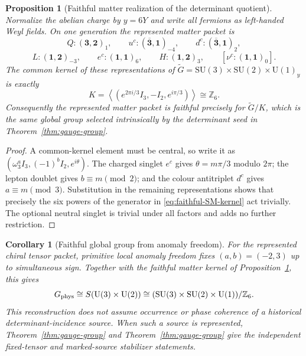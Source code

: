 \documentclass[11pt]{article}
\numberwithin{equation}{section}
\newtheorem{proposition}[theorem]{Proposition}
\newtheorem{corollary}[theorem]{Corollary}
\theoremstyle{definition}
\theoremstyle{remark}
\newcommand{\Z}{\mathbb Z}
\newcommand{\U}{\mathrm U}
\newcommand{\SU}{\mathrm{SU}}
\begin{document}
\begin{proposition}[Faithful matter realization of the determinant quotient]
\label{prop:faithful-SM-quotient}
Normalize the abelian charge by $y=6Y$ and write all fermions as left-handed
Weyl fields.  On one generation the represented matter packet is
\[
Q:(\mathbf3,\mathbf2)_1,
\qquad
u^c:(\overline{\mathbf3},\mathbf1)_{-4},
\qquad
d^c:(\overline{\mathbf3},\mathbf1)_2,
\]
\[
L:(\mathbf1,\mathbf2)_{-3},
\qquad
e^c:(\mathbf1,\mathbf1)_6,
\qquad
H:(\mathbf1,\mathbf2)_3,
\qquad
[\nu^c:(\mathbf1,\mathbf1)_0].
\]
The common kernel of these representations of
$\widetilde G=\SU(3)\times\SU(2)\times\U(1)_y$ is exactly
\begin{equation}
K
=
\left\langle
\left(e^{2\pi i/3}I_3,-I_2,e^{i\pi/3}\right)
\right\rangle
\cong\Z_6.
\label{eq:faithful-SM-kernel}
\end{equation}
Consequently the represented matter packet is faithful precisely for
$\widetilde G/K$, which is the same global group selected intrinsically by the
determinant seed in Theorem~\ref{thm:gauge-group}.
\end{proposition}

\begin{proof}
A common-kernel element must be central, so write it as
$(\omega_3^aI_3,(-1)^bI_2,e^{i\theta})$.  The charged singlet $e^c$ gives
$\theta=m\pi/3$ modulo $2\pi$; the lepton doublet gives
$b\equiv m\pmod2$; and the colour antitriplet $d^c$ gives
$a\equiv m\pmod3$.  Substitution in the remaining representations shows that
precisely the six powers of the generator in
\eqref{eq:faithful-SM-kernel} act trivially.  The optional neutral singlet is
trivial under all factors and adds no further restriction.
\end{proof}

\begin{corollary}[Faithful global group from anomaly freedom]
\label{cor:anomaly-faithful-group}
For the represented chiral tensor packet, primitive local anomaly freedom fixes
$(a,b)=(-2,3)$ up to simultaneous sign.  Together with the faithful matter
kernel of Proposition~\ref{prop:faithful-SM-quotient}, this gives
\[
 G_{\rm phys}\cong
 S(\U(3)\times\U(2))
 \cong
 (\SU(3)\times\SU(2)\times\U(1))/\Z_6.
\]
This reconstruction does not assume occurrence or phase coherence of a
historical determinant-incidence source.  When such a source is represented,
Theorem~\ref{thm:gauge-group} and
Theorem~\ref{thm:gauge-group} give the independent
fixed-tensor and marked-source stabilizer statements.
\end{corollary}
\end{document}
